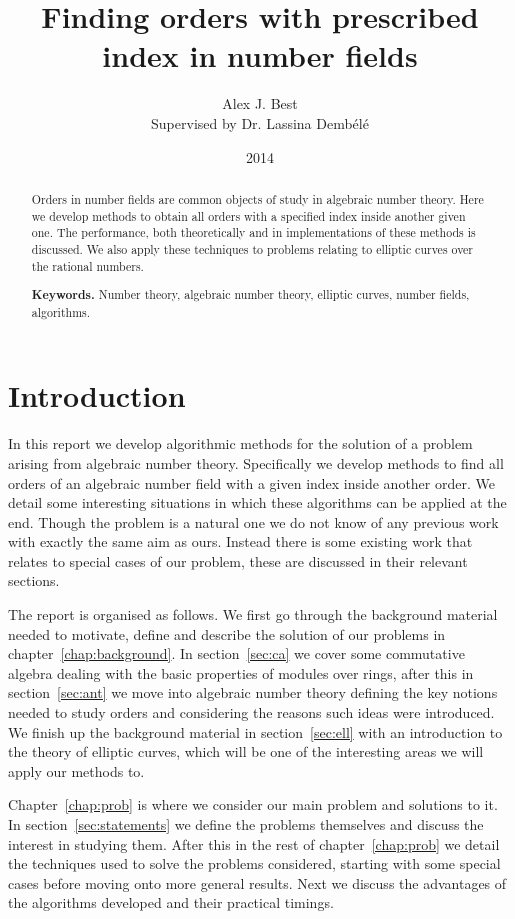 \documentclass[12pt,a4paper,abstracton,bibtotoc]{scrreprt}
\author{Alex J. Best \\ Supervised by Dr. Lassina Demb\'el\'e}
\date{2014}
\title{Finding orders with prescribed index in number fields}
\theoremstyle{definition}
\begin{document}
\maketitle

\begin{abstract}
Orders in number fields are common objects of study in algebraic number theory.
Here we develop methods to obtain all orders with a specified index inside another given one.
The performance, both theoretically and in implementations of these methods is discussed.
We also apply these techniques to problems relating to elliptic curves over the rational numbers.

\smallskip
\noindent \textbf{Keywords.} Number theory, algebraic number theory, elliptic curves, number fields, algorithms.
\end{abstract}

\tableofcontents

\chapter{Introduction}
In this report we develop algorithmic methods for the solution of a problem arising from algebraic number theory.
Specifically we develop methods to find all orders of an algebraic number field with a given index inside another order.
We detail some interesting situations in which these algorithms can be applied at the end.
Though the problem is a natural one we do not know of any previous work with exactly the same aim as ours.
Instead there is some existing work that relates to special cases of our problem, these are discussed in their relevant sections.

The report is organised as follows.
We first go through the background material needed to motivate, define and describe the solution of our problems in chapter~\ref{chap:background}.
In section~\ref{sec:ca} we cover some commutative algebra dealing with the basic properties of modules over rings, after this in section~\ref{sec:ant} we move into algebraic number theory defining the key notions needed to study orders and considering the reasons such ideas were introduced.
We finish up the background material in section~\ref{sec:ell} with an introduction to the theory of elliptic curves, which will be one of the interesting areas we will apply our methods to.

Chapter~\ref{chap:prob} is where we consider our main problem and solutions to it.
In section~\ref{sec:statements} we define the problems themselves and discuss the interest in studying them.
After this in the rest of chapter~\ref{chap:prob} we detail the techniques used to solve the problems considered, starting with some special cases before moving onto more general results.
Next we discuss the advantages of the algorithms developed and their practical timings.
\end{document}
